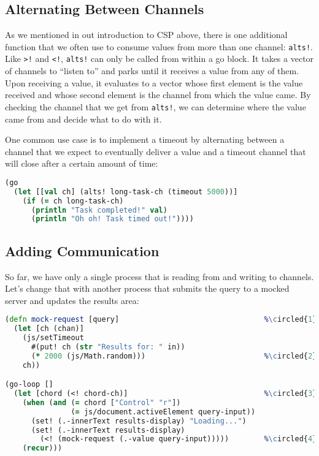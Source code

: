\documentclass[10pt,twoside,openright]{memoir}
\newcommand*\circled[1]{\tikz[baseline=(char.base)]{
            \node[shape=circle,draw,inner sep=1pt] (char) {#1};}}
\begin{document}
\subsection{Alternating Between Channels}

As we mentioned in out introduction to CSP above, there is one
additional function that we often use to consume values from more than
one channel: \texttt{alts!}. Like \texttt{\textgreater{}!} and
\texttt{\textless{}!}, \texttt{alts!} can only be called from within a
go block. It takes a vector of channels to ``listen to'' and parks until
it receives a value from any of them. Upon receiving a value, it
evaluates to a vector whose first element is the value received and
whose second element is the channel from which the value came. By
checking the channel that we get from \texttt{alts!}, we can determine
where the value came from and decide what to do with it.

One common use case is to implement a timeout by alternating between a
channel that we expect to eventually deliver a value and a timeout
channel that will close after a certain amount of time:

\begin{lstlisting}[language=Clojure]
(go
  (let [[val ch] (alts! long-task-ch (timeout 5000))]
    (if (= ch long-task-ch)
      (println "Task completed!" val)
      (println "Oh oh! Task timed out!"))))
\end{lstlisting}


\subsection{Adding Communication}

So far, we have only a single process that is reading from and writing
to channels. Let's change that with another process that submits the
query to a mocked server and updates the results area:

\begin{lstlisting}[language=Clojure, caption={Making a mock request}]
(defn mock-request [query]                                 %\circled{1}%
  (let [ch (chan)]
    (js/setTimeout
      #(put! ch (str "Results for: " in))
      (* 2000 (js/Math.random)))                           %\circled{2}%
    ch))

(go-loop []
  (let [chord (<! chord-ch)]                               %\circled{3}%
    (when (and (= chord ["Control" "r"])
               (= js/document.activeElement query-input))
      (set! (.-innerText results-display) "Loading...")
      (set! (.-innerText results-display)
        (<! (mock-request (.-value query-input)))))        %\circled{4}%
    (recur)))
\end{lstlisting}
\end{document}
